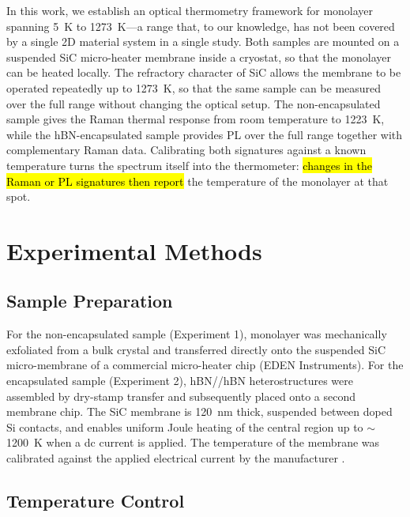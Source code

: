 \documentclass[letterpaper]{article}
\DeclareRobustCommand{\revB}[1]{\hl{#1}}
\begin{document}
In this work, we establish an optical thermometry
framework for monolayer  spanning 5~K to 1273~K---a range that, to our
knowledge, has not been covered by a single 2D material system in a single
study. Both samples are mounted on a suspended SiC micro-heater membrane inside
a cryostat, so that the monolayer can be heated locally. The refractory character of SiC allows the membrane to
be operated repeatedly up to 1273~K, so that the same sample can be measured
over the full range without changing the optical setup. The non-encapsulated sample gives the Raman thermal response from
room temperature to 1223~K, while the hBN-encapsulated sample provides PL over
the full range together with complementary Raman data. Calibrating both
signatures against a known temperature turns the spectrum itself into the
thermometer: \revB{changes in the Raman or PL signatures then report} the temperature of
the monolayer at that spot.

\section{Experimental Methods}

\subsection{Sample Preparation}

For the non-encapsulated sample (Experiment 1), monolayer  was
mechanically exfoliated from a bulk crystal and transferred directly onto the
suspended SiC micro-membrane of a commercial micro-heater chip (EDEN
Instruments). For the encapsulated sample (Experiment 2), hBN//hBN
heterostructures were assembled by dry-stamp transfer \cite{castellanos-gomez-2014}
and subsequently placed onto a second membrane chip. The SiC membrane is
120~nm thick, suspended between doped Si contacts, and enables uniform Joule
heating of the central region up to $\sim$1200~K when a dc current is applied.
The temperature of the membrane was calibrated against the applied electrical
current by the manufacturer \cite{lee-2026d}.

\subsection{Temperature Control}
\end{document}
